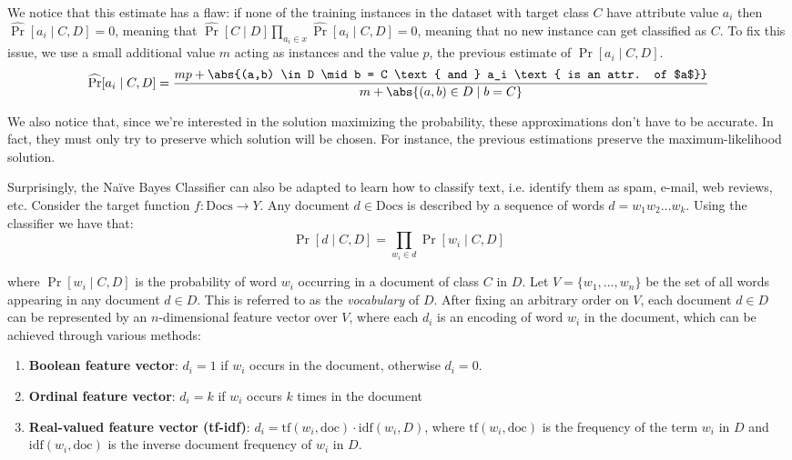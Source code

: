 \documentclass[a4paper, 12pt]{report}
\begin{document}
    We notice that this estimate has a flaw: if none of the training instances in the dataset with target class $C$ have attribute value $a_i$ then $\widehat \Pr[a_i \mid C, D] = 0$, meaning that $\widehat \Pr[C \mid D] \prod_{a_i \in x} \widehat \Pr[a_i \mid C,D] = 0$, meaning that no new instance can get classified as $C$. To fix this issue, we use a small additional value $m$ acting as  instances and the value $p$, the previous estimate of $\Pr[a_i \mid C,D]$.
    \[\widehat \Pr[a_i \mid C, D] = \frac{mp + \abs{(a,b) \in D \mid b = C \text{ and } a_i \text{ is an attr. of $a$}}}{m + \abs{(a,b) \in D \mid b = C}}\]

    We also notice that, since we're interested in the solution maximizing the probability, these approximations don't have to be accurate. In fact, they must only try to preserve which solution will be chosen. For instance, the previous estimations preserve the maximum-likelihood solution.


    Surprisingly, the Naïve Bayes Classifier can also be adapted to learn how to classify text, i.e. identify them as spam, e-mail, web reviews, etc. Consider the target function $f : \mathrm{Docs} \to Y$. Any document $d \in \mathrm{Docs}$ is described by a sequence of words $d = w_1 w_2 \ldots w_k$. Using the classifier we have that:
    \[\Pr[d \mid C, D] = \prod_{w_i \in d} \Pr[w_i \mid C, D]\]

    where $\Pr[w_i \mid C, D]$ is the probability of word $w_i$ occurring in a document of class $C$ in $D$. Let $V = \{w_1, \ldots, w_n\}$ be the set of all words appearing in any document $d \in D$. This is referred to as the \textit{vocabulary} of $D$. After fixing an arbitrary order on $V$, each document $d \in D$ can be represented by an $n$-dimensional feature vector over $V$, where each $d_i$ is an encoding of word $w_i$ in the document, which can be achieved through various methods:
    \begin{enumerate}
        \item \textbf{Boolean feature vector}: $d_i = 1$ if $w_i$ occurs in the document, otherwise $d_i = 0$.
        \item \textbf{Ordinal feature vector}: $d_i = k$ if $w_i$ occurs $k$ times in the document
        \item \textbf{Real-valued feature vector (tf-idf)}: $d_i = \mathrm{tf}(w_i, \mathrm{doc}) \cdot \mathrm{idf}(w_i, D)$, where $\mathrm{tf}(w_i, \mathrm{doc})$ is the frequency of the term $w_i$ in $D$ and $\mathrm{idf}(w_i, \mathrm{doc})$ is the inverse document frequency of $w_i$ in $D$.
    \end{enumerate}
\end{document}
